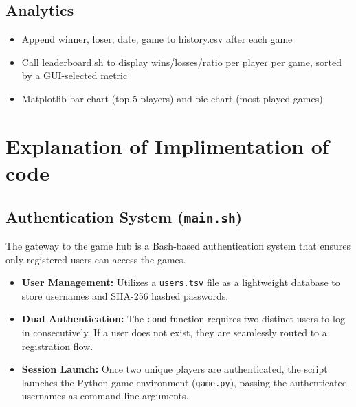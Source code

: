 \documentclass{report}
\begin{document}
\subsection{Analytics}
\begin{itemize}
    \item Append winner, loser, date, game to history.csv after each game \\ 
    \item Call leaderboard.sh to display wins/losses/ratio per player per game, sorted by a GUI-selected metric \\ 
    \item Matplotlib bar chart (top 5 players) and pie chart (most played games)
\end{itemize}
\clearpage
\section{Explanation of Implimentation of code}

\subsection{Authentication System (\texttt{main.sh})}
The gateway to the game hub is a Bash-based authentication system that ensures only registered users can access the games. 
\begin{itemize}
    \item \textbf{User Management:} Utilizes a \texttt{users.tsv} file as a lightweight database to store usernames and SHA-256 hashed passwords.
    \item \textbf{Dual Authentication:} The \texttt{cond} function requires two distinct users to log in consecutively. If a user does not exist, they are seamlessly routed to a registration flow.
    \item \textbf{Session Launch:} Once two unique players are authenticated, the script launches the Python game environment (\texttt{game.py}), passing the authenticated usernames as command-line arguments.
\end{itemize}
\end{document}
